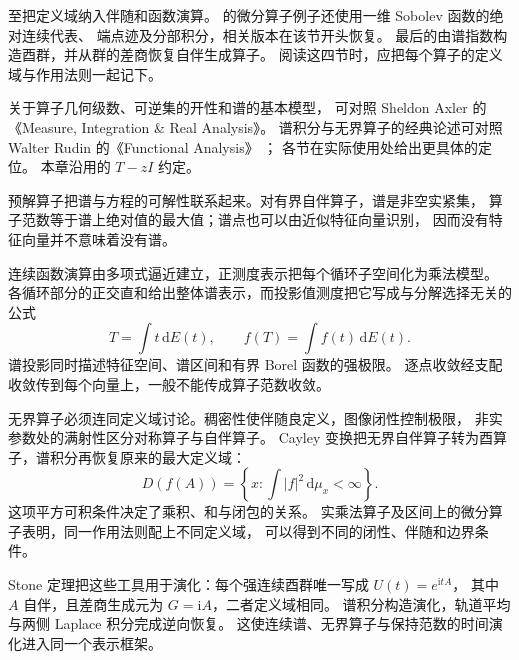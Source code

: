 \ProseParagraphBreak

至把定义域纳入伴随和函数演算。
的微分算子例子还使用一维 Sobolev 函数的绝对连续代表、
端点迹及分部积分，相关版本在该节开头恢复。
最后的由谱指数构造酉群，并从群的差商恢复自伴生成算子。
阅读这四节时，应把每个算子的定义域与作用法则一起记下。

\ProseParagraphBreak

关于算子几何级数、可逆集的开性和谱的基本模型，
可对照 Sheldon Axler 的《Measure, Integration \& Real Analysis》\cite[pp.~288--296]{Axler2020Measure}。
谱积分与无界算子的经典论述可对照 Walter Rudin 的《Functional Analysis》
\cite[Sections~12.17--12.21, 13.1--13.12, 13.24, 13.30, 13.35, 13.38]{Rudin1991Functional}；
各节在实际使用处给出更具体的定位。
本章沿用的 \(T-zI\) 约定。










\begin{chaptersummary}
预解算子把谱与方程的可解性联系起来。对有界自伴算子，谱是非空实紧集，
算子范数等于谱上绝对值的最大值；谱点也可以由近似特征向量识别，
因而没有特征向量并不意味着没有谱。

连续函数演算由多项式逼近建立，正测度表示把每个循环子空间化为乘法模型。
各循环部分的正交直和给出整体谱表示，而投影值测度把它写成与分解选择无关的公式
\[
 T=\int t\,\mathrm dE(t),\qquad f(T)=\int f(t)\,\mathrm dE(t).
\]
谱投影同时描述特征空间、谱区间和有界 Borel 函数的强极限。
逐点收敛经支配收敛传到每个向量上，一般不能传成算子范数收敛。

无界算子必须连同定义域讨论。稠密性使伴随良定义，图像闭性控制极限，
非实参数处的满射性区分对称算子与自伴算子。
Cayley 变换把无界自伴算子转为酉算子，谱积分再恢复原来的最大定义域：
\[
 D(f(A))=\left\{x:\int|f|^2\,\mathrm d\mu_x<\infty\right\}.
\]
这项平方可积条件决定了乘积、和与闭包的关系。
实乘法算子及区间上的微分算子表明，同一作用法则配上不同定义域，
可以得到不同的闭性、伴随和边界条件。

Stone 定理把这些工具用于演化：每个强连续酉群唯一写成 \(U(t)=e^{\mathrm itA}\)，
其中 \(A\) 自伴，且差商生成元为 \(G=\mathrm iA\)，二者定义域相同。
谱积分构造演化，轨道平均与两侧 Laplace 积分完成逆向恢复。
这使连续谱、无界算子与保持范数的时间演化进入同一个表示框架。
\end{chaptersummary}

